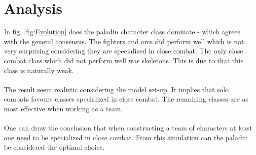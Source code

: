 \documentclass[a4paper,12pt]{article}
\begin{document}
\newpage
\section{Analysis}\label{sec:Analysis}
In fig. \ref{fig:Evolution} does the paladin character class dominate - which agrees with the general consensus.
The fighters and orcs did perform well which is not very surprising considering they are specialized in close combat.
The only close combat class which did not perform well was skeletons. This is due to that this class is naturally weak.
\\
\\
The result seem realistic considering the model set-up.
It implies that solo combats favours classes specialized in close combat.
The remaining classes are as most effective when working as a team.
\\
\\
One can draw the conclusion that when constructing a team of characters at least one need to be specialized in close combat.
From this simulation can the paladin be considered the optimal choice.



\appendix
\newpage
\end{document}
